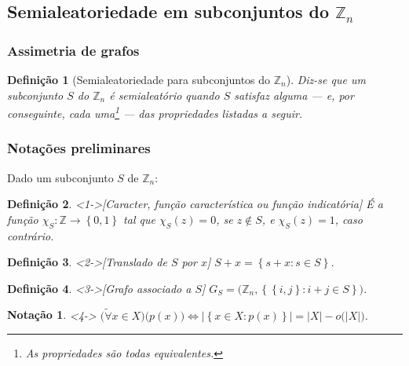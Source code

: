 \documentclass{beamer}
\def\MMZ{\mathbb{Z}} %
\def\chaves#1{\left\{ #1 \right\}} %
\def\funcao#1#2#3{#1\colon #2\rightarrow #3} %
\def\cj#1{\chaves{#1}} %
\def\cjpp#1#2{\chaves{#1\colon#2}} %
\def\foraa{\tilde{\forall}}
\theoremstyle{teoaxicorlem}
\theoremstyle{defnotnom}
\newtheorem{Def}{Definição}
\newtheorem{Not}{Notação}
\begin{document}
\subsection{Semialeatoriedade em subconjuntos do $\MMZ_n$}

\begin{frame}
  \frametitle{Assimetria de grafos}
  \begin{Def}[Semialeatoriedade para subconjuntos do $\MMZ_n$]
    Diz-se que um subconjunto $S$ do $\MMZ_n$ é \alert{semialeatório}
    quando $S$ satisfaz alguma --- e, por conseguinte, cada
    uma\footnote{As propriedades são todas equivalentes.} --- das
    propriedades listadas a seguir.
  \end{Def}
\end{frame}



\begin{frame}
  \frametitle{Notações preliminares}
  \footnotesize
  Dado um subconjunto $S$ de $\MMZ_n$:
  \begin{Def}<1->[Caracter, função característica ou função indicatória]
    \footnotesize
    É a função
    $\funcao{\chi_S}{\MMZ}{\cj{0,1}}$ tal que $\chi_S(z) = 0$, se
    $z\notin S$, e $\chi_S(z) = 1$, caso contrário.
  \end{Def}
  \vfill
  \begin{Def}<2->[Translado de $S$ por $x$]
    $S+x = \cjpp{s+x}{s\in S}$.
  \end{Def}
  \vfill
  \begin{Def}<3->[Grafo associado a $S$]
    $G_S = \bigl(\MMZ_n,\cjpp{\cj{i,j}}{i+j\in S}\bigr)$.
  \end{Def}
  \begin{Not}<4->
    $\bigl(\foraa x\in X\bigr)\bigl(p(x)\bigr) \Longleftrightarrow
    \bigl|\cjpp{x\in X}{p(x)}\bigr| = |X| - o\bigl(|X|\bigr)$.
  \end{Not}
\end{frame}
\end{document}
